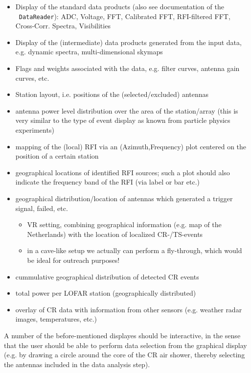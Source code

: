 \documentclass[a4paper,10pt,bibtotoc]{scrartcl}
\begin{document}
\begin{itemize}
\item Display of the standard data products (also see documentation of the
  \lopestools\ \verb|DataReader|): ADC, Voltage, FFT, Calibrated FFT,
  RFI-filtered FFT, Cross-Corr. Spectra, Visibilities
\item Display of the (intermediate) data products generated from the input
  data, e.g. dynamic spectra, multi-dimensional skymaps
\item Flags and weights associated with the data, e.g. filter curves, antenna
  gain curves, etc.
\item Station layout, i.e. positions of the (selected/excluded) antennas
\item antenna power level distribution over the area of the station/array
  (this is very similar to the type of event display as known from particle
  physics experiments)
\item mapping of the (local) RFI via an (Azimuth,Frequency) plot centered on
  the position of a certain station
\item geographical locations of identified RFI sources; such a plot should
  also indicate the  frequency band of the RFI (via label or bar etc.)
\item geographical distribution/location of antennas which generated a trigger
  signal, failed, etc.
  \begin{itemize}
  \item[$\rightarrow$] VR setting, combining geographical information (e.g.
    map of the Netherlands) with the location of localized CR-/TS-events
  \item[$\Rightarrow$] in a cave-like setup we actually can perform a
  fly-through, which would be ideal for outreach purposes!
  \end{itemize}
\item cummulative geographical distribution of detected CR events
\item total power per LOFAR station (geographically distributed)
\item overlay of CR data with information from other sensors (e.g. weather
  radar images, temperatures, etc.)
\end{itemize}
A number of the before-mentioned displayes should be interactive, in the sense
that the user should be able to perform data selection from the graphical
display (e.g. by drawing a circle around the core of the CR air shower,
thereby selecting the antennas included in the data analysis step).
\end{document}
